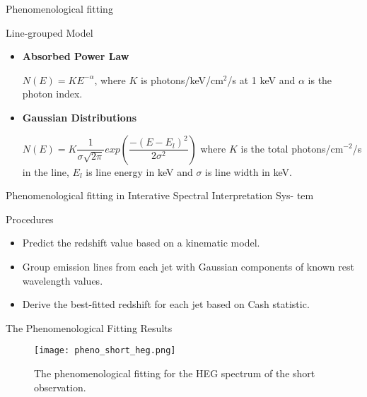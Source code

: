 \documentclass{beamer}
\begin{document}
\begin{frame}{Phenomenological fitting}
    \begin{block}{Line-grouped Model \citep{Marshall2002}}
    \begin{itemize}
        \item \textbf{Absorbed Power Law}\par
          $N(E) = KE^{-\alpha}$, where $K$ is photons/keV/cm$^2$/s at 1 keV and $\alpha$ is the photon index. 
         \item \textbf{Gaussian Distributions}\par
          $N(E) = K\dfrac{1}{\sigma \sqrt{2\pi}}exp(\dfrac{-(E-E_l)^2}{2\sigma^2})$ where $K$ is the total photons/cm$^{-2}$/s in the line, $E_l$ is line energy in keV and $\sigma$ is line width in keV.
    \end{itemize}
    \end{block}
\end{frame}

\begin{frame}{Phenomenological fitting in Interative Spectral Interpretation Sys-
tem}
    \begin{block}{Procedures}
    \begin{itemize}
         \item Predict the redshift value based on a kinematic model.
         \item Group emission lines from each jet with Gaussian components of known rest wavelength values.
         \item Derive the best-fitted redshift for each jet based on Cash statistic.
    \end{itemize}
    \end{block}
\end{frame}

\begin{frame}{The Phenomenological Fitting Results}
\begin{figure}
    \centering
    \texttt{[image: pheno\_short\_heg.png]}
    \caption{The phenomenological fitting for the HEG spectrum of the short observation. }
    \label{fig:my_label}
\end{figure}
    
\end{frame}
\end{document}
